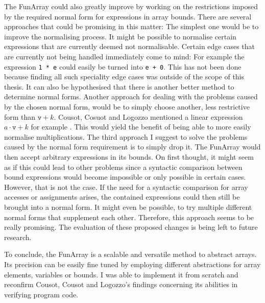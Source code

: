 The FunArray could also greatly improve by working on the restrictions imposed by the required normal form for expressions in array bounds. There are several approaches that could be promising in this matter: The simplest one would be to improve the normalising process. It might be possible to normalise certain expressions that are currently deemed not normalisable. Certain edge cases that are currently not being handled immediately come to mind: For example the expression \texttt{1 * e} could easily be turned into \texttt{e + 0}. This has not been done because finding all such speciality edge cases was outside of the scope of this thesis. It can also be hypothesised that there is another better method to determine normal forms. Another approach for dealing with the problems caused by the chosen normal form, would be to simply choose another, less restrictive form than $\texttt{v}+k$. Cousot, Cosuot and Logozzo mentioned a linear expression $a\cdot\texttt{v}+k$ for example \cite{cousot2011}. This would yield the benefit of being able to more easily normalise multiplications. The third approach I suggest to solve the problems caused by the normal form requirement is to simply drop it. The FunArray would then accept arbitrary expressions in its bounds. On first thought, it might seem as if this could lead to other problems since a syntactic comparison between bound expressions would become impossible or only possible in certain cases. However, that is not the case. If the need for a syntactic comparison for array accesses or assignments arises, the contained expressions could then still be brought into a normal form. It might even be possible, to try multiple different normal forms that supplement each other. Therefore, this approach seems to be really promising. The evaluation of these proposed changes is being left to future research.

To conclude, the FunArray is a scalable and versatile method to abstract arrays. Its precision can be easily fine tuned by employing different abstractions for array elements, variables or bounds. I was able to implement it from scratch and reconfirm Cousot, Cousot and Logozzo's findings concerning its abilities in verifying program code.